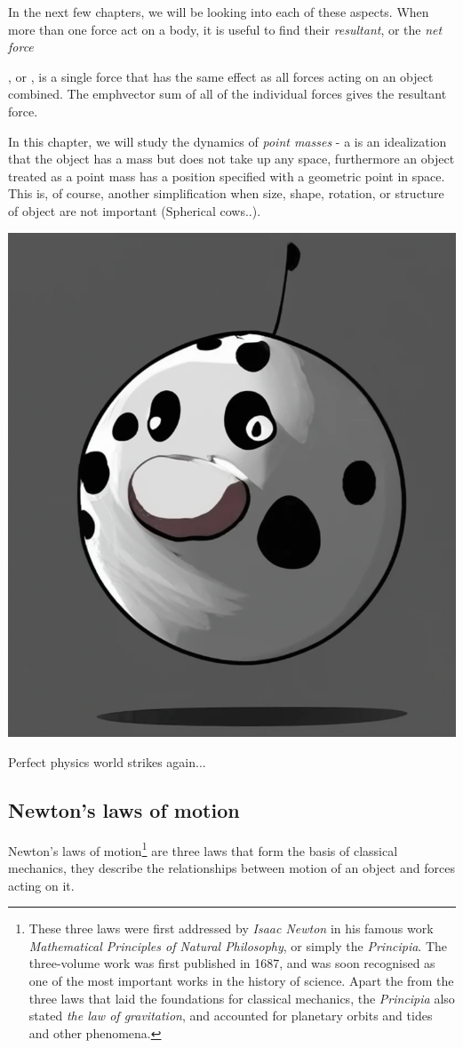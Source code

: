 In the next few chapters, we will be looking into each of these aspects. When more than one force act on a body, it is useful to find their \emph{resultant}, or the \emph{net force}

\begin{ilight}
	, or , is a single force that has the same effect as all forces acting on an object combined. The emph{vector sum} of all of the individual forces gives the resultant force.
\end{ilight}

In this chapter, we will study the dynamics of \emph{point masses} - a  is an idealization that the object has a mass but does not take up any space, furthermore an object treated as a point mass has a position specified with a geometric point in space. This is, of course, another simplification when size, shape, rotation, or structure of object are not important (Spherical cows..).\begin{marginfigure}
        \includegraphics[width=0.5\linewidth]{sphericalcow.png}
        \caption{Perfect physics world strikes again...}
\end{marginfigure}

\subsection{Newton's laws of motion}

Newton's laws of motion\footnote{These three laws were first addressed by \emph{Isaac Newton} in his famous work \emph{Mathematical Principles of Natural Philosophy}, or simply the \emph{Principia}. The three-volume work was first published in 1687, and was soon recognised as one of the most important works in the history of science. Apart the from the three laws that laid the foundations for classical mechanics, the \emph{Principia} also stated \emph{the law of gravitation}, and accounted for planetary orbits and tides and other phenomena.} are three laws that form the basis of classical mechanics, they describe the relationships between motion of an object and forces acting on it.

